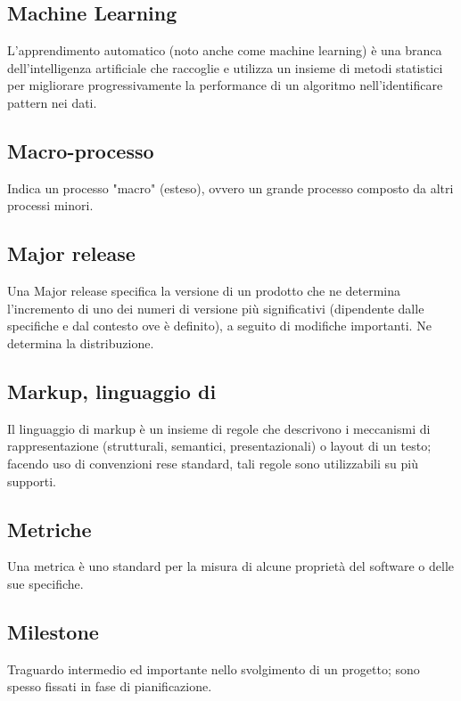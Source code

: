 
\subsection*{Machine Learning}
L’apprendimento automatico (noto anche come machine learning) è una branca dell'intelligenza artificiale che raccoglie e utilizza un insieme di metodi statistici per migliorare progressivamente la performance di un algoritmo nell'identificare pattern nei dati.

\subsection*{Macro-processo}
Indica un processo "macro" (esteso), ovvero un grande processo composto da altri processi minori.

\subsection*{Major release}
Una Major release specifica la versione di un prodotto che ne determina l’incremento di uno dei numeri di versione più significativi (dipendente dalle specifiche e dal contesto ove è definito), a seguito di modifiche importanti. Ne determina la distribuzione.

\subsection*{Markup, linguaggio di}
Il linguaggio di markup è un insieme di regole che descrivono i meccanismi di rappresentazione (strutturali, semantici, presentazionali) o layout di un testo; facendo uso di convenzioni rese standard, tali regole sono utilizzabili su più supporti.

\subsection*{Metriche}
Una metrica è uno standard per la misura di alcune proprietà del software o delle sue specifiche. 

\subsection*{Milestone}
Traguardo intermedio ed importante nello svolgimento di un progetto; sono spesso fissati in fase di pianificazione.

